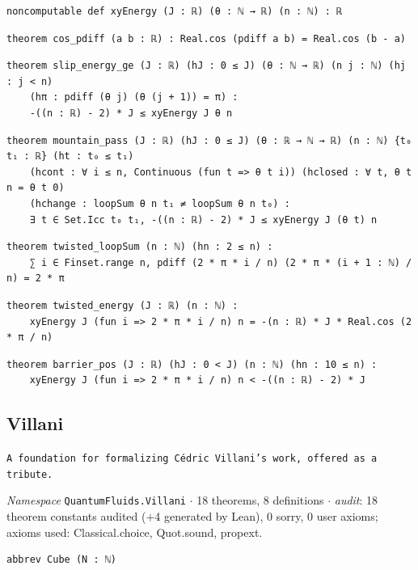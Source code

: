 \begin{lstlisting}[style=leancat]
noncomputable def xyEnergy (J : ℝ) (θ : ℕ → ℝ) (n : ℕ) : ℝ
\end{lstlisting}

\begin{lstlisting}[style=leancat]
theorem cos_pdiff (a b : ℝ) : Real.cos (pdiff a b) = Real.cos (b - a)
\end{lstlisting}

\begin{lstlisting}[style=leancat]
theorem slip_energy_ge (J : ℝ) (hJ : 0 ≤ J) (θ : ℕ → ℝ) (n j : ℕ) (hj : j < n)
    (hπ : pdiff (θ j) (θ (j + 1)) = π) :
    -((n : ℝ) - 2) * J ≤ xyEnergy J θ n
\end{lstlisting}

\begin{lstlisting}[style=leancat]
theorem mountain_pass (J : ℝ) (hJ : 0 ≤ J) (θ : ℝ → ℕ → ℝ) (n : ℕ) {t₀ t₁ : ℝ} (ht : t₀ ≤ t₁)
    (hcont : ∀ i ≤ n, Continuous (fun t => θ t i)) (hclosed : ∀ t, θ t n = θ t 0)
    (hchange : loopSum θ n t₁ ≠ loopSum θ n t₀) :
    ∃ t ∈ Set.Icc t₀ t₁, -((n : ℝ) - 2) * J ≤ xyEnergy J (θ t) n
\end{lstlisting}

\begin{lstlisting}[style=leancat]
theorem twisted_loopSum (n : ℕ) (hn : 2 ≤ n) :
    ∑ i ∈ Finset.range n, pdiff (2 * π * i / n) (2 * π * (i + 1 : ℕ) / n) = 2 * π
\end{lstlisting}

\begin{lstlisting}[style=leancat]
theorem twisted_energy (J : ℝ) (n : ℕ) :
    xyEnergy J (fun i => 2 * π * i / n) n = -(n : ℝ) * J * Real.cos (2 * π / n)
\end{lstlisting}

\begin{lstlisting}[style=leancat]
theorem barrier_pos (J : ℝ) (hJ : 0 < J) (n : ℕ) (hn : 10 ≤ n) :
    xyEnergy J (fun i => 2 * π * i / n) n < -((n : ℝ) - 2) * J
\end{lstlisting}

\subsection{Villani}\label{appA:Villani}
{\footnotesize\raggedright\texttt{A foundation for formalizing Cédric Villani's work,\allowbreak{} offered as a tribute.\allowbreak{}}\par}
{\footnotesize\raggedright\emph{Namespace} \texttt{QuantumFluids.\allowbreak{}Villani} $\cdot$ 18 theorems, 8 definitions $\cdot$ \emph{audit}: 18 theorem constants audited (+4 generated by Lean), 0 sorry, 0 user axioms; axioms used: Classical.choice, Quot.sound, propext.\par}
\vspace{1pt}
\begin{lstlisting}[style=leancat]
abbrev Cube (N : ℕ)
\end{lstlisting}

